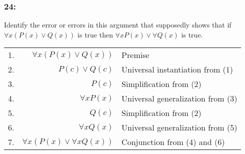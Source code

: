 \documentclass[12pt,en,a4paper]{report}
\begin{document}
	\subsubsection*{24:}
	Identify the error or errors in this argument that supposedly shows that if $\forall x (P(x) \vee Q(x))$ is true then $\forall x P(x) \vee \forall Q(x)$ is true.\\
	\begin{tabular}{r r l}
		1. & $\forall x(P(x) \vee Q(x))$ & Premise\\
		2. & $P(c) \vee Q(c)$ & Universal instantiation from (1)\\
		3. & $P(c)$ & Simplification from (2)\\
		4. & $\forall x P(x)$ & Universal generalization from (3)\\
		5. & $Q(c)$ & Simplification from (2)\\
		6. & $\forall x Q(x)$ & Universal generalization from (5)\\
		7. & $\forall x (P(x) \vee \forall x Q(x))$ & Conjunction from (4) and (6)
	\end{tabular}\\
\end{document}
